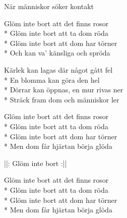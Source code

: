 \begin{SongText}
\begin{SongVerse}
        När människor söker kontakt
    \end{SongVerse}
    \begin{SongVerse}
        Glöm inte bort att det finns rosor\\*%
        Glöm inte bort att ta dom röda\\*%
        Glöm inte bort att dom har törner\\*%
        Och kan va’ känsliga och spröda
    \end{SongVerse}
    \begin{SongVerse}
        Kärlek kan lagas där något gått fel\\*%
        En blomma kan göra den hel\\*%
        Dörrar kan öppnas, en mur rivas ner\\*%
        Sträck fram dom och människor ler
    \end{SongVerse}
    \begin{SongVerse}
        Glöm inte bort att det finns rosor\\*%
        Glöm inte bort att ta dom röda\\*%
        Glöm inte bort att dom har törner\\*%
        Men dom får hjärtan börja glöda
    \end{SongVerse}
    \begin{SongVerse}
        ||: Glöm inte bort :||
    \end{SongVerse}
    \begin{SongVerse}
        Glöm inte bort att det finns rosor\\*%
        Glöm inte bort att ta dom röda\\*%
        Glöm inte bort att dom har törner\\*%
        Men dom får hjärtan börja glöda
    \end{SongVerse}
\end{SongText}